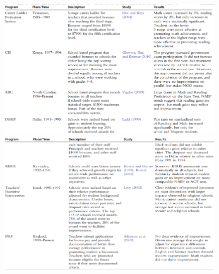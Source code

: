         \begin{figure}[H]
            \centering
            \includegraphics[width=4.5in]{images/ch10/10 pp 1.png}
            \includegraphics[width=4.5in]{images/ch10/10 pp 2.png}
        \end{figure}
